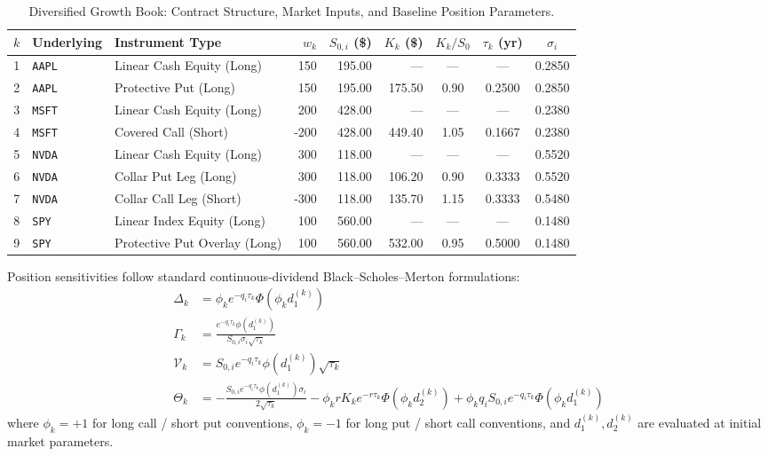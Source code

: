 \documentclass{article}
\theoremstyle{plain}
\theoremstyle{definition}
\theoremstyle{remark}
\begin{document}
\begin{table}[htbp]
\centering
\small
\caption{Diversified Growth Book: Contract Structure, Market Inputs, and Baseline Position Parameters.}
\label{tab:portfolio_spec}
\begin{tabularx}{\textwidth}{c l l r r r c c c}
\toprule
$k$ & \textbf{Underlying} & \textbf{Instrument Type} & $w_k$ & $S_{0, i}$ (\$) & $K_k$ (\$) & $K_k / S_0$ & $\tau_k$ (yr) & $\sigma_i$ \\
\midrule
1 & \texttt{AAPL} & Linear Cash Equity (Long) & 150 & 195.00 & --- & --- & --- & 0.2850 \\
2 & \texttt{AAPL} & Protective Put (Long) & 150 & 195.00 & 175.50 & 0.90 & 0.2500 & 0.2850 \\
3 & \texttt{MSFT} & Linear Cash Equity (Long) & 200 & 428.00 & --- & --- & --- & 0.2380 \\
4 & \texttt{MSFT} & Covered Call (Short) & -200 & 428.00 & 449.40 & 1.05 & 0.1667 & 0.2380 \\
5 & \texttt{NVDA} & Linear Cash Equity (Long) & 300 & 118.00 & --- & --- & --- & 0.5520 \\
6 & \texttt{NVDA} & Collar Put Leg (Long) & 300 & 118.00 & 106.20 & 0.90 & 0.3333 & 0.5520 \\
7 & \texttt{NVDA} & Collar Call Leg (Short) & -300 & 118.00 & 135.70 & 1.15 & 0.3333 & 0.5480 \\
8 & \texttt{SPY} & Linear Index Equity (Long) & 100 & 560.00 & --- & --- & --- & 0.1480 \\
9 & \texttt{SPY} & Protective Put Overlay (Long) & 100 & 560.00 & 532.00 & 0.95 & 0.5000 & 0.1480 \\
\bottomrule
\end{tabularx}
\end{table}

Position sensitivities follow standard continuous-dividend Black--Scholes--Merton formulations:
\begin{align}
    \Delta_k &= \phi_k e^{-q_i \tau_k} \Phi(\phi_k d_1^{(k)}) \\
    \Gamma_k &= \frac{e^{-q_i \tau_k} \phi(d_1^{(k)})}{S_{0, i}\sigma_i\sqrt{\tau_k}} \\
    \mathcal{V}_k &= S_{0, i} e^{-q_i \tau_k} \phi(d_1^{(k)})\sqrt{\tau_k} \\
    \Theta_k &= -\frac{S_{0, i} e^{-q_i \tau_k} \phi(d_1^{(k)})\sigma_i}{2\sqrt{\tau_k}} - \phi_k r K_k e^{-r \tau_k}\Phi(\phi_k d_2^{(k)}) + \phi_k q_i S_{0, i} e^{-q_i \tau_k}\Phi(\phi_k d_1^{(k)})
\end{align}
where $\phi_k = +1$ for long call / short put conventions, $\phi_k = -1$ for long put / short call conventions, and $d_1^{(k)}, d_2^{(k)}$ are evaluated at initial market parameters.
\end{document}
